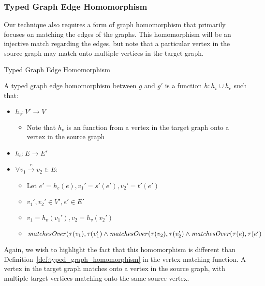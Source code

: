 \subsubsection*{Typed Graph Edge Homomorphism}

Our technique also requires a form of graph homomorphism that primarily focuses on matching the edges of the graphs. This homomorphism will be an injective match regarding the edges, but note that a particular vertex in the source graph may match onto multiple vertices in the target graph. 

\begin{definition}{Typed Graph Edge Homomorphism\\}
\label{def:typed_graph_edge_homomorphism}

A typed graph edge homomorphism between $g$ and $g'$ is a function $h: h_v \cup h_e$ such that:
\begin{itemize}
\item $h_v: V'\rightarrow V$
\begin{itemize}
\item Note that $h_v$ is an function from a vertex in the target graph onto a vertex in the source graph
\end{itemize}
\item $h_e: E\rightarrow E'$
\item $\forall v_1 \xrightarrow{e} v_2\in E$:
\begin{itemize}
\item Let $e' = h_e(e), v_1' = s'(e'), v_2' = t'(e')$
\item $v_1', v_2' \in V', e' \in E'$
\item $v_1 = h_v(v_1'), v_2 = h_v(v_2')$
\item $\mathit{matchesOver}(\tau(v_1), \tau(v_1') \land \\\mathit{matchesOver}(\tau(v_2), \tau(v_2') \land\\ \mathit{matchesOver}(\tau(e), \tau(e')$
\end{itemize}

\end{itemize}  
\end{definition}

Again, we wish to highlight the fact that this homomorphism is different than Definition~\ref{def:typed_graph_homomorphism} in the vertex matching function. A vertex in the target graph matches onto a vertex in the source graph, with multiple target vertices matching onto the same source vertex. 

